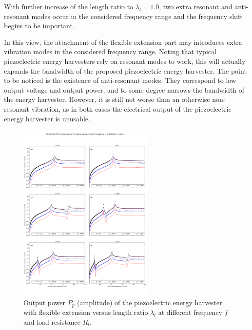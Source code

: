 \documentclass{elsarticle}
\begin{document}
With further increase of the length ratio to $\lambda_l = 1.0$, two extra resonant and anti-resonant modes occur in the considered frequency range and the frequency shift begins to be important. 


In this view, the attachment of the flexible extension part may introduces extra vibration modes in the considered frequency range. Noting that typical piezoelectric energy harvesters rely on resonant modes to work, this will actually expands the bandwidth of the proposed piezoelectric energy harvester. The point to be noticed is the existence of anti-resonant modes. They correspond to low output voltage and output power, and to some degree narrows the bandwidth of the energy harvester. However, it is still not worse than an otherwise non-resonant vibration, as in both cases the electrical output of the piezoelectric energy harvester is unusable.


\begin{figure}[!htbp]
    \centering
    \includegraphics[width=0.6\textwidth]{./fig_output_power_vs_fr_Rl_laml_all}
    \caption{Output power $P_p$ (amplitude) of the piezoelectric energy harvester with flexible extension versus length ratio $\lambda_l$ at different frequency $f$ and load resistance $R_l$. }
    \label{fig:fig_output_power_vs_fr_Rl_laml_all}
\end{figure}
\end{document}
